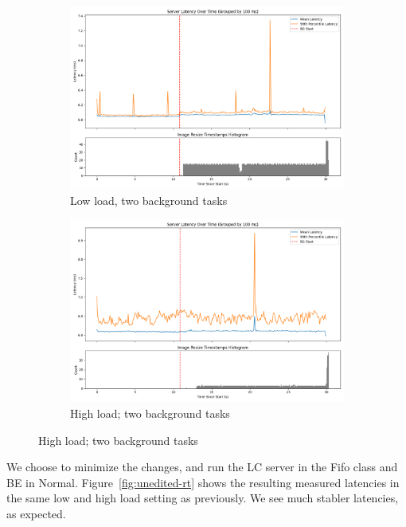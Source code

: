 \begin{figure}[t]
    \centering
    \begin{subfigure}[t]{0.48\textwidth}
        \includegraphics[width=\textwidth]{graphs/unedited-rt-low-two.png}
        \caption{Low load, two background tasks}\label{fig:unedited-rt-low-two}
    \end{subfigure}
    \hspace{\fill}
    \begin{subfigure}[t]{0.48\textwidth}
        \includegraphics[width=\textwidth]{graphs/unedited-rt-high-two.png}
        \caption{High load; two background tasks}\label{fig:unedited-rt-high-two}
    \end{subfigure}
\end{figure}\label{fig:unedited-rt}

We choose to minimize the changes, and run the LC server in the Fifo class and
BE in Normal. Figure~\ref{fig:unedited-rt} shows the resulting measured
latencies in the same low and high load setting as previously. We see much
stabler latencies, as expected.

